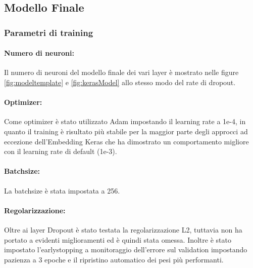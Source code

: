 \subsection{Modello Finale}
\subsubsection{Parametri di training}

\paragraph{Numero di neuroni:} Il numero di neuroni del modello finale dei vari
layer è mostrato nelle figure \ref{fig:modeltemplate} e \ref{fig:kerasModel}
allo stesso modo del rate di dropout.

\paragraph{Optimizer:} Come optimizer è stato utilizzato Adam impostando il
learning rate a 1e-4, in quanto il training è risultato più stabile per la
maggior parte degli approcci ad eccezione dell'Embedding Keras che ha dimostrato
un comportamento migliore con il learning rate di default (1e-3).

\paragraph{Batchsize:} La batchsize è stata impostata a 256.

\paragraph{Regolarizzazione:} Oltre ai layer Dropout è stato testata la
regolarizzazione L2, tuttavia non ha portato a evidenti miglioramenti ed è
quindi stata omessa. Inoltre è stato impostato l'earlystopping a monitoraggio
dell'errore sul validation impostando pazienza a 3 epoche e il ripristino
automatico dei pesi più performanti.

